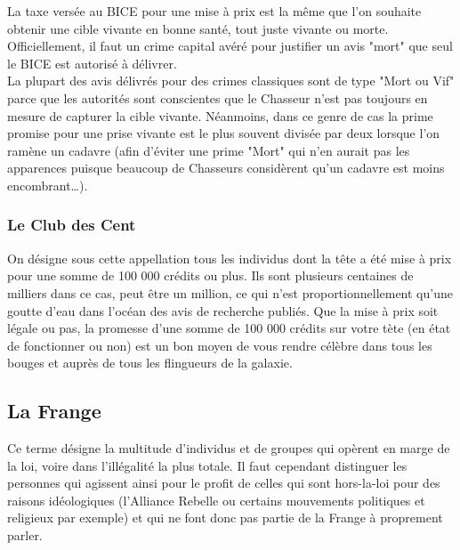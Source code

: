 \documentclass[twoside]{article}
\begin{document}
La taxe versée au BICE pour une mise à prix est la même que l'on souhaite obtenir une cible vivante en bonne santé, tout juste vivante ou morte. Officiellement, il faut un crime capital avéré pour justifier un avis "mort" que seul le BICE est autorisé à délivrer.\\

La plupart des avis délivrés pour des crimes classiques sont de type "Mort ou Vif" parce que les autorités sont conscientes que le Chasseur n'est pas toujours en mesure de capturer la cible vivante. Néanmoins, dans  ce genre de cas la prime promise pour une prise vivante est le plus souvent divisée par deux lorsque l'on ramène un cadavre (afin d'éviter une prime "Mort" qui n'en aurait pas les apparences puisque beaucoup de Chasseurs considèrent qu'un cadavre est moins encombrant\ldots).

\subsubsection{Le Club des Cent}
On désigne sous cette appellation tous les individus dont la tête a été mise à prix pour une somme de 100 000 crédits ou plus. Ils sont plusieurs centaines de milliers dans ce cas, peut être un million, ce qui n'est proportionnellement qu'une goutte d'eau dans l'océan des avis de recherche publiés. Que la mise à prix soit légale ou pas, la promesse d'une somme de 100 000 crédits sur votre tète (en état de fonctionner ou non) est un bon moyen de vous rendre célèbre dans tous les bouges et auprès de tous les flingueurs de la galaxie.

\subsection{La Frange}
Ce terme désigne la multitude d'individus et de groupes qui opèrent en marge de la loi, voire dans l'illégalité la plus totale. Il faut cependant distinguer les personnes qui agissent ainsi pour le profit de celles qui sont hors-la-loi pour des raisons idéologiques (l'Alliance Rebelle ou certains mouvements politiques et religieux par exemple) et qui ne font donc pas partie de la Frange à proprement parler.
\end{document}
